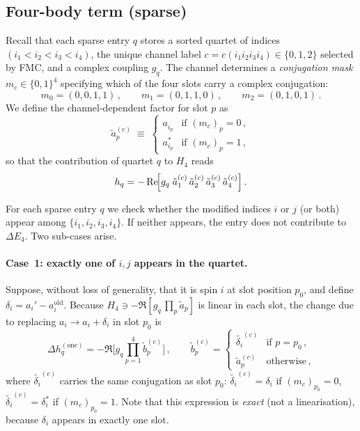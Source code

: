 \documentclass[11pt,a4paper]{article}
\begin{document}
\subsection{Four-body term (sparse)}

Recall that each sparse entry $q$ stores a sorted quartet of indices
$(i_1\!<\!i_2\!<\!i_3\!<\!i_4)$, the unique channel label
$c = c(i_1 i_2 i_3 i_4)\in\{0,1,2\}$ selected by FMC, and a
complex coupling $g_q$.  The channel determines a \emph{conjugation mask}
$m_c \in \{0,1\}^4$ specifying which of the four slots carry a complex
conjugation:
\begin{equation}\label{eq:conj}
  m_0 = (0,0,1,1)\,,\qquad
  m_1 = (0,1,1,0)\,,\qquad
  m_2 = (0,1,0,1)\,.
\end{equation}
We define the channel-dependent factor for slot $p$ as
\begin{equation}\label{eq:tilde}
  \tilde a_p^{(c)} \;\equiv\;
    \begin{cases}
      a_{i_p}^{\phantom{*}} & \text{if } (m_c)_p = 0\,,\\[2pt]
      a_{i_p}^{*}           & \text{if } (m_c)_p = 1\,,
    \end{cases}
\end{equation}
so that the contribution of quartet $q$ to $H_4$ reads
\begin{equation}\label{eq:H4q}
  h_q = -\Re\!\Bigl[
    g_q \;\tilde a_1^{(c)}\,\tilde a_2^{(c)}\,
          \tilde a_3^{(c)}\,\tilde a_4^{(c)}
  \Bigr]\,.
\end{equation}

For each sparse entry $q$ we check whether the modified indices $i$ or $j$
(or both) appear among $\{i_1,i_2,i_3,i_4\}$.  If neither appears, the
entry does not contribute to $\Delta E_4$.  Two sub-cases arise.

\paragraph{Case~1: exactly one of $i,j$ appears in the quartet.}
Suppose, without loss of generality, that it is spin $i$ at slot position
$p_0$, and define $\delta_i = a_i' - a_i^{\mathrm{old}}$.  Because
$H_4 \ni -\Re[g_q\,\prod_p \tilde a_p]$ is linear in each slot, the
change due to replacing $a_i\to a_i + \delta_i$ in slot $p_0$ is
\begin{equation}\label{eq:dE4_one}
  \Delta h_q^{(\mathrm{one})} = -\Re\!\Biggl[
    g_q \prod_{p=1}^{4} \tilde b_p^{(c)}
  \Biggr]\,,\qquad
  \tilde b_p^{(c)} =
    \begin{cases}
      \widetilde{\delta_i}^{(c)} & \text{if } p = p_0\,,\\[2pt]
      \tilde a_p^{(c)}           & \text{otherwise}\,,
    \end{cases}
\end{equation}
where $\widetilde{\delta_i}^{(c)}$ carries the same conjugation as
slot $p_0$:
$\widetilde{\delta_i}^{(c)} = \delta_i$ if $(m_c)_{p_0}=0$,
$\widetilde{\delta_i}^{(c)} = \delta_i^*$ if $(m_c)_{p_0}=1$.
Note that this expression is \emph{exact} (not a linearisation), because
$\delta_i$ appears in exactly one slot.
\end{document}

